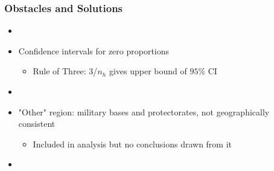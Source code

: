 \documentclass{beamer}
\begin{document}
\begin{frame}
\frametitle{Obstacles and Solutions}
\begin{itemize}

\item[]

\item Confidence intervals for zero proportions
\begin{itemize}
\item Rule of Three: 3/$n_h$ gives upper bound of $95\%$ CI
\end{itemize}

\item[]

\item "Other" region: military bases and protectorates, not geographically consistent
\begin{itemize}
\item Included in analysis but no conclusions drawn from it
\end{itemize}

\item[]

\end{itemize}
\end{frame}
\end{document}
